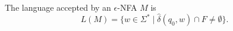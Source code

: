 

\setcounter{section}{1}
\setcounter{subsection}{4}
\setcounter{dfn}{15}

\begin{dfn}
The language accepted by an $\epsilon$-NFA $M$ is
\[
L(M) = \{w \in \Sigma^* \mid \widehat{\delta}(q_0, w) \cap F \ne \emptyset\}.
\]
\end{dfn}

